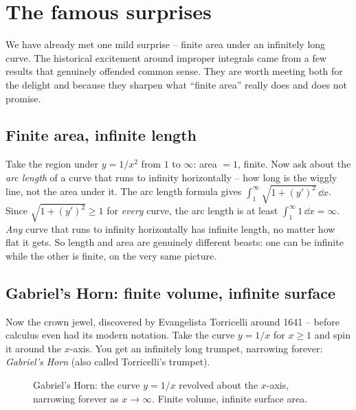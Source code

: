 \section{The famous surprises}
\label{ch25:surprises}

We have already met one mild surprise -- finite area under an infinitely long
curve. The historical excitement around improper integrals came from a few results
that genuinely offended common sense. They are worth meeting both for the delight
and because they sharpen what ``finite area'' really does and does not promise.

\subsection{Finite area, infinite length}
\label{ch25:area-vs-length}

\begin{intuitionbox}
Take the region under $y = 1/x^2$ from $1$ to $\infty$: area $= 1$, finite. Now ask
about the \emph{arc length} of a curve that runs to infinity horizontally -- how
long is the wiggly line, not the area under it. The arc length formula gives
$\int_1^\infty \sqrt{1 + (y')^2}\,\dd x$. Since $\sqrt{1+(y')^2} \ge 1$ for
\emph{every} curve, the arc length is at least $\int_1^\infty 1\,\dd x = \infty$.
\emph{Any} curve that runs to infinity horizontally has infinite length, no matter
how flat it gets. So length and area are genuinely different beasts: one can be
infinite while the other is finite, on the very same picture.
\end{intuitionbox}

\subsection{Gabriel's Horn: finite volume, infinite surface}
\label{ch25:gabriels-horn}

Now the crown jewel, discovered by Evangelista Torricelli around 1641 -- before
calculus even had its modern notation. Take the curve $y = 1/x$ for $x \ge 1$ and
spin it around the $x$-axis. You get an infinitely long trumpet, narrowing forever:
\emph{Gabriel's Horn} (also called Torricelli's trumpet).

\begin{figure}[H]
\centering
{}
\caption{Gabriel's Horn: the curve $y=1/x$ revolved about the $x$-axis, narrowing
forever as $x\to\infty$. Finite volume, infinite surface area.}
\label{ch25:fig-horn}
\end{figure}

